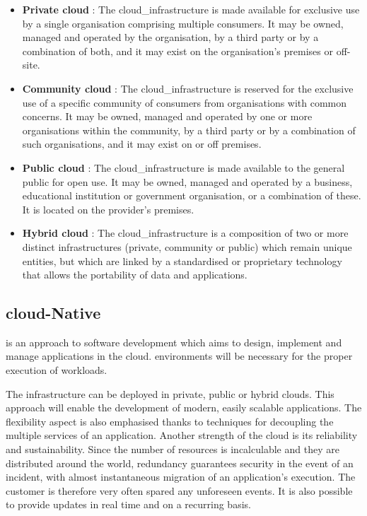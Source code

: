 \begin{itemize}
    \item \textbf{Private \gls{cloud}} : The \gls{cloud_infrastructure} is made available for exclusive use by a single organisation comprising multiple consumers. It may be owned, managed and operated by the organisation, by a third party or by a combination of both, and it may exist on the organisation's premises or off-site.
    \item \textbf{Community \gls{cloud}} : The \gls{cloud_infrastructure} is reserved for the exclusive use of a specific community of consumers from organisations with common concerns. It may be owned, managed and operated by one or more organisations within the community, by a third party or by a combination of such organisations, and it may exist on or off premises.
    \item \textbf{Public \gls{cloud}} : The \gls{cloud_infrastructure} is made available to the general public for open use. It may be owned, managed and operated by a business, educational institution or government organisation, or a combination of these. It is located on the provider's premises.
    \item \textbf{Hybrid \gls{cloud}} : The \gls{cloud_infrastructure} is a composition of two or more distinct infrastructures (private, community or public) which remain unique entities, but which are linked by a standardised or proprietary technology that allows the portability of data and applications.
\end{itemize}

\subsection{\Gls{cloud}-Native}
\label{subsec:cloudnative}
 is an approach to software development which aims to design, implement and manage applications in the \gls{cloud}.  environments will be necessary for the proper execution of workloads.

The infrastructure can be deployed in private, public or hybrid \glspl{cloud}. This approach will enable the development of modern, easily scalable applications. The flexibility aspect is also emphasised thanks to techniques for decoupling the multiple services of an application. Another strength of the \gls{cloud} is its reliability and sustainability. Since the number of resources is incalculable and they are distributed around the world, redundancy guarantees security in the event of an incident, with almost instantaneous migration of an application's execution. The customer is therefore very often spared any unforeseen events. It is also possible to provide updates in real time and on a recurring basis.

